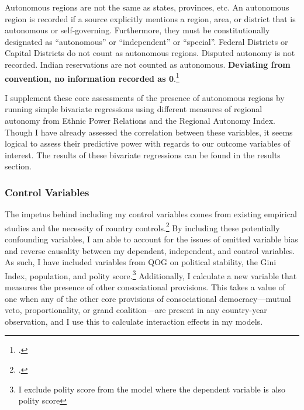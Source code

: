 \documentclass[12pt]{article}
\begin{document}
\singlespacing
Autonomous regions are not the same as states, provinces, etc. An autonomous region is recorded if a source explicitly mentions a region, area, or district that is autonomous or self-governing. Furthermore, they must be constitutionally designated as ``autonomous'' or ``independent'' or ``special''. Federal Districts or Capital Districts do not count as autonomous regions. Disputed autonomy is not recorded. Indian reservations are not counted as autonomous. \textbf{Deviating from convention, no information recorded as 0}.\footcite[emphasis in original]{keefer_database_2018}

\doublespacing
I supplement these core assessments of the presence of autonomous regions by running simple bivariate regressions using different measures of regional autonomy from Ethnic Power Relations and the Regional Autonomy Index. Though I have already assessed the correlation between these variables, it seems logical to assess their predictive power with regards to our outcome variables of interest. The results of these bivariate regressions can be found in the results section. 

\subsubsection{Control Variables} 
The impetus behind including my control variables comes from existing empirical studies and the necessity of country controls.\footcite{hartzell_crafting_2007, kelly_power-sharing_2019, norris_evidence_2008, strom_inclusion_2017, walter_committing_2002} By including these potentially confounding variables, I am able to account for the issues of omitted variable bias and reverse causality between my dependent, independent, and control variables. As such, I have included variables from QOG on political stability, the Gini Index, population, and polity score.\footnote{I exclude polity score from the model where the dependent variable is also polity score} Additionally, I calculate a new variable that measures the presence of other consociational provisions. This takes a value of one when any of the other core provisions of consociational democracy---mutual veto, proportionality, or grand coalition---are present in any country-year observation, and I use this to calculate interaction effects in my models. 
\end{document}
